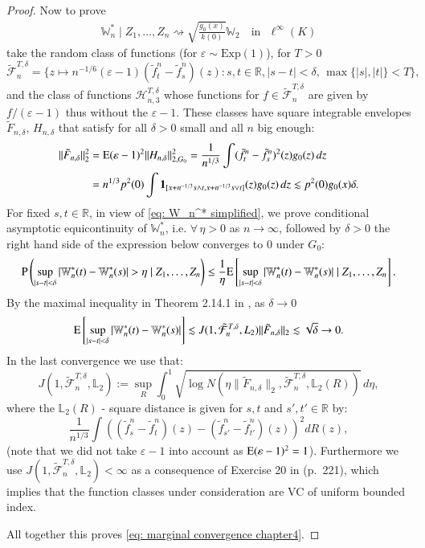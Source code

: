 \begin{proof}
Now to prove
\begin{align}
\mathbb{W}_n^*\mid Z_1, \dots, Z_n \rightsquigarrow \sqrt{\frac{g_0(x)}{k(0)}} \mathbb{W}_2 \quad \text{in } \, \, \ell^\infty(K)
\end{align}
take the random class of functions (for $\varepsilon \sim \mathrm{Exp}(1)$), for $T >0$
\[
\tilde{\mathcal{F}}_n^{T,\delta} = \{ z \mapsto n^{-1/6}(\varepsilon-1)(\tilde{f}_{t}^n - \tilde{f}_{s}^n)(z) : s, t \in \mathbb{R}, |s-t| < \delta, \, \max\{|s|,|t|\} < T \},
\]
and the class of functions $\mathcal{H}_{n,3}^{T,\delta}$ whose functions for $f \in \tilde{\mathcal{F}}_n^{T,\delta}$ are given by $f/(\varepsilon-1)$ thus without the $\varepsilon-1$. These classes have square integrable envelopes $\tilde{F}_{n,\delta}$, $H_{n,\delta}$ that satisfy for all $\delta > 0$ small and all $n$ big enough:
\begin{align*}
\| \tilde{F}_{n,\delta} \|_2^2 &= \mathrm{E} (\varepsilon-1)^2 \|H_{n,\delta}\|_{2,G_0}^2 = \frac{1}{n^{1/3}} \int (\tilde{f}_{t}^n - \tilde{f}_{s}^n)^2(z) g_0(z) \, dz\\
&= n^{1/3} p^2(0) \int \mathbf{1}_{[x+n^{-1/3}s \wedge t, x+n^{-1/3}s \vee t]}(z) g_0(z) \, dz \lesssim p^2(0) g_0(x) \delta.
\end{align*}
For fixed $s,t \in \mathbb{R}$, in view of \eqref{eq: W_n^* simplified}, we prove conditional asymptotic equicontinuity of $\mathbb{W}_n^*$, i.e. $\forall \, \eta > 0$ as $n \to \infty$, followed by $\delta > 0$ the right hand side of the expression below converges to $0$ under $G_0$:
\[
\mathrm{P} \left( \sup_{|s-t|<\delta} |\mathbb{W}_n^*(t) - \mathbb{W}_n^*(s)| > \eta \mid Z_1, \dots, Z_n \right) \leq \frac{1}{\eta} \mathrm{E} \left[ \sup_{|s-t|<\delta} |\mathbb{W}_n^*(t) -\mathbb{W}_n^*(s)| \mid Z_1, \dots, Z_n \right].
\]
By the maximal inequality in Theorem 2.14.1 in \cite{5}, as $\delta \rightarrow 0$
\[
\mathrm{E} \left[ \sup_{|s-t|<\delta} |\mathbb{W}_n^*(t) - \mathbb{W}_n^*(s)| \right] \lesssim J(1, \tilde{\mathcal{F}}_n^{T,\delta}, L_2) \| \tilde{F}_{n,\delta} \|_2 \lesssim \sqrt{\delta} \to 0.
\]
In the last convergence we use that:
\[
J(1, \tilde{\mathcal{F}}_n^{T,\delta}, \mathbb{L}_2) := \sup_R \int_0^1 \sqrt{\log N(\eta \| \tilde{F}_{n,\delta} \|_2, \tilde{\mathcal{F}}_n^{T,\delta}, \mathbb{L}_2(R))} \, d\eta,
\]
where the $\mathbb{L}_2(R)$ - square distance is given for $s,t$ and $s', t' \in \mathbb{R}$ by:
$$\frac{1}{n^{1/3}} \int \left( (\tilde{f}_{s}^n - \tilde{f}_{t}^n)(z) - (\tilde{f}_{s'}^n - \tilde{f}_{t'}^n)(z) \right)^2 dR(z), $$
(note that we did not take $\varepsilon -1 $ into account as $\mathrm{E}(\varepsilon -1 )^2=1$). 
Furthermore we use $J(1, \tilde{\mathcal{F}}_n^{T,\delta}, \mathbb{L}_2) < \infty$ as a consequence of Exercise 20 in \cite{5} (p.\ 221), which implies that the function classes under consideration are VC of uniform bounded index.

All together this proves \eqref{eq: marginal convergence chapter4}.

\end{proof}


